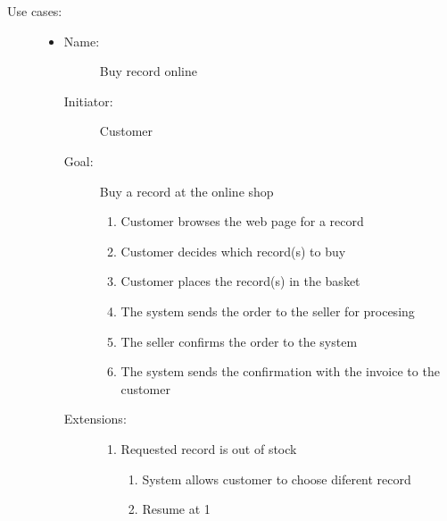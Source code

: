 \documentclass[12pt, titlepage, a4paper]{article}
\begin{document}
\begin{description}
    \item[Use cases:] \hfil
    \begin{itemize}
    \item
        \begin{description}
            \item[Name:]Buy record online 
            \item[Initiator:]Customer
            \item[Goal:]Buy a record at the online shop 
            \begin{enumerate}
                \item Customer browses the web page for a record
                \item Customer decides which record(s) to buy
                \item Customer places the record(s) in the basket
                \item The system sends the order to the seller for procesing
                \item The seller confirms the order to the system
                \item The system sends the confirmation with the invoice to the customer
            \end{enumerate}
            \item[Extensions:] \hfil
            \begin{enumerate}
                \item Requested record is out of stock
                \begin{enumerate}
                    \item System allows customer to choose diferent record
                    \item Resume at 1
                \end{enumerate}
            \end{enumerate}
        \end{description}


\end{itemize}
\end{description}
\end{document}
